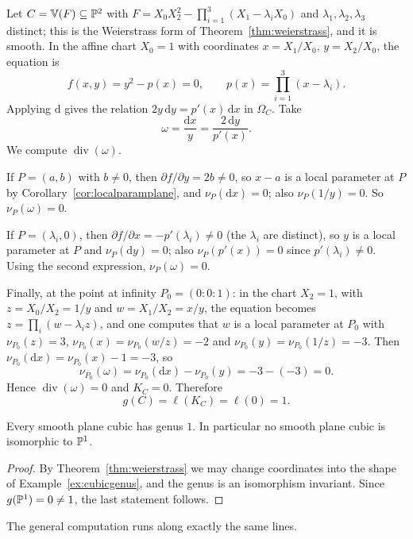 \documentclass[a4paper]{scrartcl}
\newcommand{\V}{\mathbb{V}}
\newcommand{\dee}{\mathrm{d}}
\DeclareMathOperator{\Divv}{div}
\begin{document}
\begin{example}\label{ex:cubicgenus}
	Let $C = \V(F) \subseteq \PP^2$ with $F = X_0X_2^2 - \prod_{i=1}^3(X_1 - \lambda_iX_0)$ and $\lambda_1,\lambda_2,\lambda_3$ distinct; this is the Weierstrass form of Theorem~\ref{thm:weierstrass}, and it is smooth. In the affine chart $X_0 = 1$ with coordinates $x = X_1/X_0$, $y = X_2/X_0$, the equation is
	$$f(x,y) = y^2 - p(x) = 0, \qquad p(x) = \prod_{i=1}^3(x - \lambda_i).$$
	Applying $\dee$ gives the relation $2y\,\dee y = p'(x)\,\dee x$ in $\Omega_C$. Take
	$$\omega = \frac{\dee x}{y} = \frac{2\,\dee y}{p'(x)}.$$
	We compute $\Divv(\omega)$.

	If $P = (a,b)$ with $b \neq 0$, then $\partial f/\partial y = 2b \neq 0$, so $x - a$ is a local parameter at $P$ by Corollary~\ref{cor:localparamplane}, and $\nu_P(\dee x) = 0$; also $\nu_P(1/y) = 0$. So $\nu_P(\omega) = 0$.

	If $P = (\lambda_i,0)$, then $\partial f/\partial x = -p'(\lambda_i)\neq 0$ (the $\lambda_i$ are distinct), so $y$ is a local parameter at $P$ and $\nu_P(\dee y) = 0$; also $\nu_P(p'(x)) = 0$ since $p'(\lambda_i)\neq0$. Using the second expression, $\nu_P(\omega) = 0$.

	Finally, at the point at infinity $P_0 = (0:0:1)$: in the chart $X_2 = 1$, with $z = X_0/X_2 = 1/y$ and $w = X_1/X_2 = x/y$, the equation becomes $z = \prod_i(w-\lambda_iz)$, and one computes that $w$ is a local parameter at $P_0$ with $\nu_{P_0}(z) = 3$, $\nu_{P_0}(x) = \nu_{P_0}(w/z) = -2$ and $\nu_{P_0}(y) = \nu_{P_0}(1/z) = -3$. Then $\nu_{P_0}(\dee x) = \nu_{P_0}(x) - 1 = -3$, so
	$$\nu_{P_0}(\omega) = \nu_{P_0}(\dee x) - \nu_{P_0}(y) = -3 - (-3) = 0.$$
	Hence $\Divv(\omega) = 0$ and $K_C = 0$. Therefore
	$$g(C) = \ell(K_C) = \ell(0) = 1.$$
\end{example}

\begin{theorem}\label{thm:cubicgenus1}
	Every smooth plane cubic has genus $1$. In particular no smooth plane cubic is isomorphic to $\mathbb{P}^1$.
\end{theorem}

\begin{proof}
	By Theorem~\ref{thm:weierstrass} we may change coordinates into the shape of Example~\ref{ex:cubicgenus}, and the genus is an isomorphism invariant. Since $g(\mathbb{P}^1) = 0 \neq 1$, the last statement follows.
\end{proof}

The general computation runs along exactly the same lines.
\end{document}
